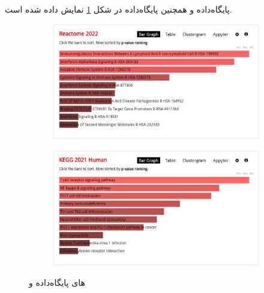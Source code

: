 \documentclass{article}
\begin{document}
پایگاه‌داده  و همچنین پایگاه‌داده  در شکل \ref{fig:enrichr-pathways-reactome-kegg} نمایش داده شده است.

\begin{figure}[h!]
	\begin{subfigure}{.5\columnwidth}
		\centering
		\includegraphics[width=\columnwidth]{figs/enrichr-pathways-reactome-2.jpg}
	\end{subfigure}
	\begin{subfigure}{.5\columnwidth}
		\centering
		\includegraphics[width=\columnwidth]{figs/enrichr-pathways-kegg-2.jpg}
	\end{subfigure}
	\caption{های پایگاه‌داده  و }
	\label{fig:enrichr-pathways-reactome-kegg}
\end{figure}
\end{document}
